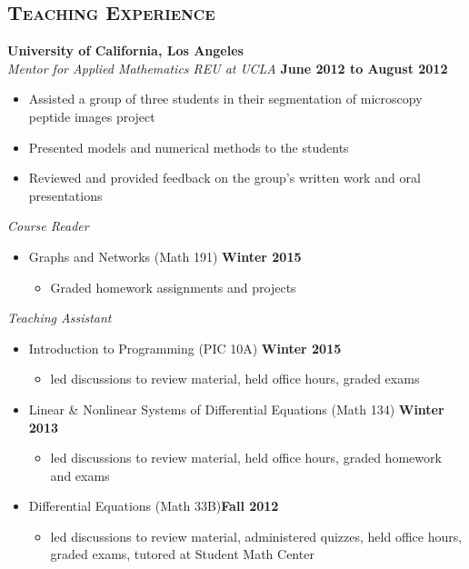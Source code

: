 \documentclass[margin, 10pt]{res} %
\begin{document}
\begin{resume}
\section{\textsc{Teaching Experience}}
\textbf{University of California, Los Angeles}\\
\textit{Mentor for Applied Mathematics REU at UCLA } \hfill \textbf{June 2012 to August 2012}\\
\begin{itemize}
\item Assisted a group of three students in their segmentation of microscopy peptide images project
\item Presented models and numerical methods to the students
\item Reviewed and provided feedback on the group's written work and oral presentations
\end{itemize}
\textit{Course Reader} 
\begin{itemize}
\item Graphs and Networks (Math 191) \hfill \textbf{Winter 2015}
\begin{itemize}
\item Graded homework assignments and projects
\end{itemize}
\end{itemize}
\textit{Teaching Assistant}
\begin{itemize}
\item Introduction to Programming (PIC 10A) \hfill \textbf{Winter 2015}
\begin{itemize}
\item led discussions to review material, held office hours, graded exams
\end{itemize}
\item Linear \& Nonlinear Systems of Differential Equations (Math 134) \hfill \textbf{Winter 2013} 
\begin{itemize}
\item led discussions to review material, held office hours, graded homework and exams
\end{itemize}
\item Differential Equations (Math 33B)\hfill \textbf{Fall 2012}
\begin{itemize}
\item led discussions to review material, administered quizzes, held office hours, graded exams, tutored at Student Math Center
\end{itemize}
\end{itemize}




\end{resume}
\end{document}
